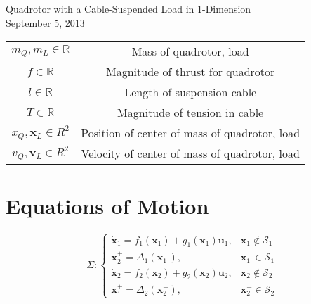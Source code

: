 \documentclass[11pt]{article}
\begin{document}
\centering
Quadrotor with a Cable-Suspended Load in 1-Dimension \\
September 5, 2013

\raggedright

\begin{table} [h!]
\footnotesize
\begin{tabular}{ c c }
	$m_Q, m_L \in \mathbb{R}$ & Mass of quadrotor, load \\
	$f \in \mathbb{R}$ & Magnitude of thrust for quadrotor \\
	$l \in \mathbb{R}$ & Length of suspension cable \\
	$T \in \mathbb{R}$ & Magnitude of tension in cable \\
	${x}_Q, \mathbf{x}_L \in {R}^2$ & Position of center of mass of quadrotor, load \\
	${v}_Q, \mathbf{v}_L \in {R}^2$ & Velocity of center of mass of quadrotor, load \\
\end{tabular}
\label{tab: vars}
\end{table}




\newpage
\small

\section{Equations of Motion} 
\[
    \Sigma : 
\begin{cases}
    \mathbf{\dot{x}}_1 = f_1(\mathbf{x}_1) + g_1(\mathbf{x}_1) \mathbf{u}_1, & \mathbf{x}_1 \not\in \mathcal{S}_1 \\
    \mathbf{x}_2^+ = \Delta_1(\mathbf{x}_1^-), & \mathbf{x}_1^- \in \mathcal{S}_1 \\
    \mathbf{\dot{x}}_2 = f_2(\mathbf{x}_2) + g_2(\mathbf{x}_2) \mathbf{u}_2, & \mathbf{x}_2 \not\in \mathcal{S}_2 \\
    \mathbf{x}_1^+ = \Delta_2(\mathbf{x}_2^-), & \mathbf{x}_2^- \in \mathcal{S}_2 
\end{cases}
\]
\end{document}

